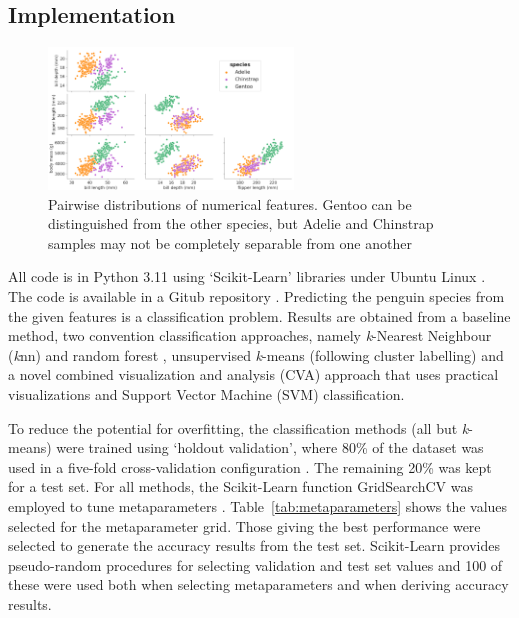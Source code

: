 \documentclass[12pt]{article}
\begin{document}
\subsection*{Implementation}

\begin{figure} %
  \centering
  \vspace{-3\baselineskip} %
  \includegraphics[width=0.58\textwidth]{pairwise.png} %
  \vspace{-0.5\baselineskip} %
  \caption{Pairwise distributions of numerical features. Gentoo can be distinguished from the other species, 
  but Adelie and Chinstrap samples may not be completely separable from one another}
  \vspace{-0.5\baselineskip} %
  \label{fig:pairwise}
\end{figure}

All code is in Python 3.11 \cite{python311} using ‘Scikit-Learn’ libraries \cite{scikit-learn} 
under Ubuntu Linux \cite{ubuntu}. The code is available in a Gitub repository \cite{TimAIRepo}. 
Predicting the penguin species from the given features is a classification problem. 
Results are obtained from a baseline method, two convention classification approaches, 
namely \textit{k}-Nearest Neighbour (\textit{k}nn) \cite{bishop2006pattern} and random forest \cite{breiman2001random}, 
unsupervised \textit{k}-means (following cluster labelling) \cite{tan2005introduction} 
and a novel combined visualization and analysis (CVA) approach that uses 
practical visualizations and Support Vector Machine (SVM) classification.

To reduce the potential for overfitting, the classification methods (all but \textit{k}-means) were trained using 
`holdout validation', where 80\% of the dataset was used in a five-fold cross-validation 
configuration \cite{james2013introduction}. The remaining 20\% was kept for a test set. For all methods, 
the Scikit-Learn function GridSearchCV was employed to tune metaparameters \cite{scikit-learn}. 
Table~\ref{tab:metaparameters} shows the values selected for the metaparameter grid. Those giving the best 
performance were selected to generate the accuracy results from the test set. 
Scikit-Learn provides pseudo-random procedures for selecting validation and test set values and 100 of these were used 
both when selecting metaparameters and when deriving accuracy results.
\end{document}
